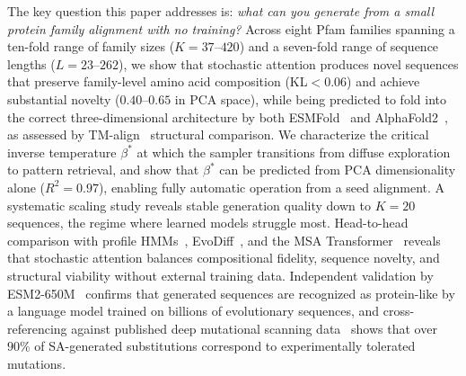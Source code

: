 The key question this paper addresses is: \emph{what can you generate from a small protein family alignment with no training?} Across eight Pfam families spanning a ten-fold range of family sizes ($K{=}37$--$420$) and a seven-fold range of sequence lengths ($L{=}23$--$262$), we show that stochastic attention produces novel sequences that preserve family-level amino acid composition (KL${}<0.06$) and achieve substantial novelty ($0.40$--$0.65$ in PCA space), while being predicted to fold into the correct three-dimensional architecture by both ESMFold~\cite{linEvolutionaryScaleModeling2023} and AlphaFold2~\cite{jumperHighlyAccurateProtein2021}, as assessed by TM-align~\cite{zhangTMalign2005} structural comparison. We characterize the critical inverse temperature $\beta^*$ at which the sampler transitions from diffuse exploration to pattern retrieval, and show that $\beta^*$ can be predicted from PCA dimensionality alone ($R^2{=}0.97$), enabling fully automatic operation from a seed alignment. A systematic scaling study reveals stable generation quality down to $K{=}20$ sequences, the regime where learned models struggle most. Head-to-head comparison with profile HMMs~\cite{hmmer3}, EvoDiff~\cite{alamdariProteinGeneration2023}, and the MSA Transformer~\cite{raoMSATransformer2021} reveals that stochastic attention balances compositional fidelity, sequence novelty, and structural viability without external training data. Independent validation by ESM2-650M~\cite{linEvolutionaryScaleModeling2023} confirms that generated sequences are recognized as protein-like by a language model trained on billions of evolutionary sequences, and cross-referencing against published deep mutational scanning data~\cite{mclaughlinSpatialArchitecture2012,faureDoubleDMS2022} shows that over $90\%$ of SA-generated substitutions correspond to experimentally tolerated mutations.
